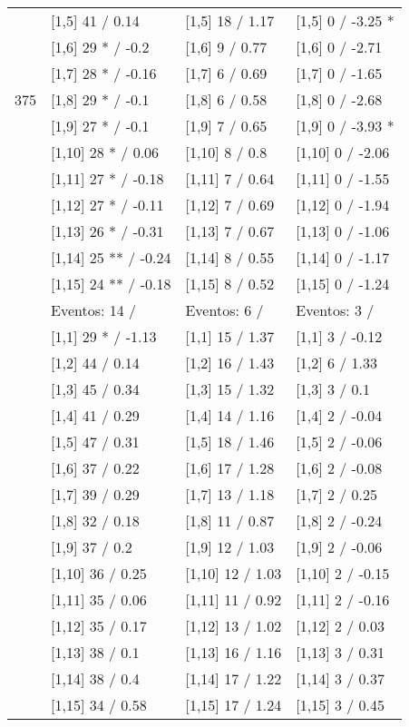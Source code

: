 \begin{table}
\begin{tabular}[t]{llll}
 & {}[1,5] 41  / 0.14 & {}[1,5] 18  / 1.17 & {}[1,5] 0  / -3.25 *\\
 & {}[1,6] 29 * / -0.2 & {}[1,6] 9  / 0.77 & {}[1,6] 0  / -2.71\\
 & {}[1,7] 28 * / -0.16 & {}[1,7] 6  / 0.69 & {}[1,7] 0  / -1.65\\
375 & {}[1,8] 29 * / -0.1 & {}[1,8] 6  / 0.58 & {}[1,8] 0  / -2.68\\
\addlinespace
 & {}[1,9] 27 * / -0.1 & {}[1,9] 7  / 0.65 & {}[1,9] 0  / -3.93 *\\
 & {}[1,10] 28 * / 0.06 & {}[1,10] 8  / 0.8 & {}[1,10] 0  / -2.06\\
 & {}[1,11] 27 * / -0.18 & {}[1,11] 7  / 0.64 & {}[1,11] 0  / -1.55\\
 & {}[1,12] 27 * / -0.11 & {}[1,12] 7  / 0.69 & {}[1,12] 0  / -1.94\\
 & {}[1,13] 26 * / -0.31 & {}[1,13] 7  / 0.67 & {}[1,13] 0  / -1.06\\
\addlinespace
 & {}[1,14] 25 ** / -0.24 & {}[1,14] 8  / 0.55 & {}[1,14] 0  / -1.17\\
 & {}[1,15] 24 ** / -0.18 & {}[1,15] 8  / 0.52 & {}[1,15] 0  / -1.24\\
 & Eventos:  14 / & Eventos:  6 / & Eventos:  3 /\\
 & {}[1,1] 29 * / -1.13 & {}[1,1] 15  / 1.37 & {}[1,1] 3  / -0.12\\
 & {}[1,2] 44  / 0.14 & {}[1,2] 16  / 1.43 & {}[1,2] 6  / 1.33\\
\addlinespace
 & {}[1,3] 45  / 0.34 & {}[1,3] 15  / 1.32 & {}[1,3] 3  / 0.1\\
 & {}[1,4] 41  / 0.29 & {}[1,4] 14  / 1.16 & {}[1,4] 2  / -0.04\\
 & {}[1,5] 47  / 0.31 & {}[1,5] 18  / 1.46 & {}[1,5] 2  / -0.06\\
 & {}[1,6] 37  / 0.22 & {}[1,6] 17  / 1.28 & {}[1,6] 2  / -0.08\\
 & {}[1,7] 39  / 0.29 & {}[1,7] 13  / 1.18 & {}[1,7] 2  / 0.25\\
\addlinespace
500 & {}[1,8] 32  / 0.18 & {}[1,8] 11  / 0.87 & {}[1,8] 2  / -0.24\\
 & {}[1,9] 37  / 0.2 & {}[1,9] 12  / 1.03 & {}[1,9] 2  / -0.06\\
 & {}[1,10] 36  / 0.25 & {}[1,10] 12  / 1.03 & {}[1,10] 2  / -0.15\\
 & {}[1,11] 35  / 0.06 & {}[1,11] 11  / 0.92 & {}[1,11] 2  / -0.16\\
 & {}[1,12] 35  / 0.17 & {}[1,12] 13  / 1.02 & {}[1,12] 2  / 0.03\\
\addlinespace
 & {}[1,13] 38  / 0.1 & {}[1,13] 16  / 1.16 & {}[1,13] 3  / 0.31\\
 & {}[1,14] 38  / 0.4 & {}[1,14] 17  / 1.22 & {}[1,14] 3  / 0.37\\
 & {}[1,15] 34  / 0.58 & {}[1,15] 17  / 1.24 & {}[1,15] 3  / 0.45\\
\bottomrule
\end{tabular}
\end{table}

